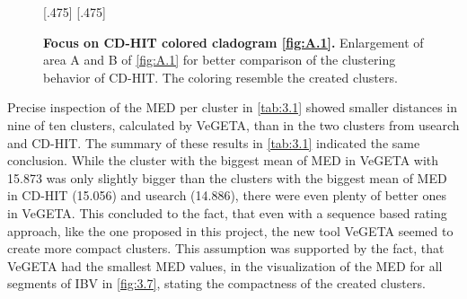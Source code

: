     \begin{figure}[!htb]
        \centering
        [.475\textwidth]{}\hfill 
        [.475\textwidth]{}
        \caption[Focus on CD-HIT colored cladogram \autoref{fig:A.1}]{\textbf{Focus on CD-HIT colored cladogram \autoref{fig:A.1}.} Enlargement of area A and B of \autoref{fig:A.1} for better comparison of the clustering behavior of CD-HIT. The coloring resemble the created clusters.}
        \label{fig:3.5}
    \end{figure}
    
    Precise inspection of the \gls{MED} per cluster in \autoref{tab:3.1} showed smaller distances in nine of ten clusters, calculated by VeGETA, than in the two clusters from usearch and CD-HIT. The summary of these results in \autoref{tab:3.1} indicated the same conclusion. While the cluster with the biggest mean of \gls{MED} in VeGETA with 15.873 was only slightly bigger than the clusters with the biggest mean of \gls{MED} in CD-HIT (15.056) and usearch (14.886), there were even plenty of better ones in VeGETA. This concluded to the fact, that even with a sequence based rating approach, like the one proposed in this project, the new tool VeGETA seemed to create more compact clusters. This assumption was supported by the fact, that VeGETA had the smallest \gls{MED} values, in the visualization of the \gls{MED} for all segments of \gls{IBV} in \autoref{fig:3.7}, stating the compactness of the created clusters.
    
